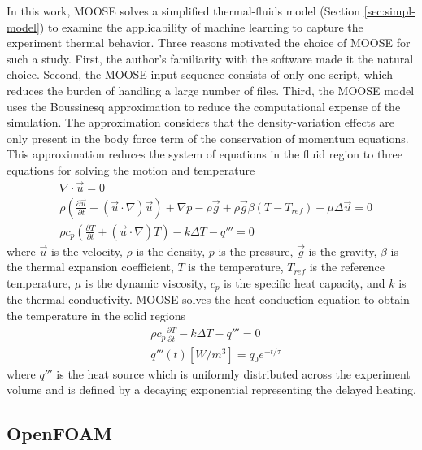In this work, MOOSE solves a simplified thermal-fluids model (Section \ref{sec:simpl-model}) to examine the applicability of machine learning to capture the experiment thermal behavior.
Three reasons motivated the choice of MOOSE for such a study.
First, the author's familiarity with the software made it the natural choice.
Second, the MOOSE input sequence consists of only one script, which reduces the burden of handling a large number of files.
Third, the MOOSE model uses the Boussinesq approximation to reduce the computational expense of the simulation.
The approximation considers that the density-variation effects are only present in the body force term of the conservation of momentum equations.
This approximation reduces the system of equations in the fluid region to three equations for solving the motion and temperature
\begin{align}
& \nabla \cdot \vec{u} = 0 \\
& \rho \left( \frac{\partial \vec{u}}{\partial t} + (\vec{u} \cdot \nabla)\vec{u} \right) + \nabla p - \rho \vec{g} + \rho \vec{g} \beta (T - T_{ref}) - \mu \Delta \vec{u}= 0 \\
& \rho c_p \left( \frac{\partial T}{\partial t} + (\vec{u} \cdot \nabla) T \right) - k \Delta T - q''' = 0  
\end{align}
where $\vec{u}$ is the velocity, $\rho$ is the density, $p$ is the pressure, $\vec{g}$ is the gravity, $\beta$ is the thermal expansion coefficient, $T$ is the temperature, $T_{ref}$ is the reference temperature, $\mu$ is the dynamic viscosity, $c_p$ is the specific heat capacity, and $k$ is the thermal conductivity.
MOOSE solves the heat conduction equation to obtain the temperature in the solid regions
\begin{align}
& \rho c_p \frac{\partial T}{\partial t} - k \Delta T - q''' = 0 \\
& q'''(t)[W/m^3] = q_0 e^{-t/\tau}
\end{align}
where $q'''$ is the heat source which is uniformly distributed across the experiment volume and is defined by a decaying exponential representing the delayed heating.


\subsection{OpenFOAM}

